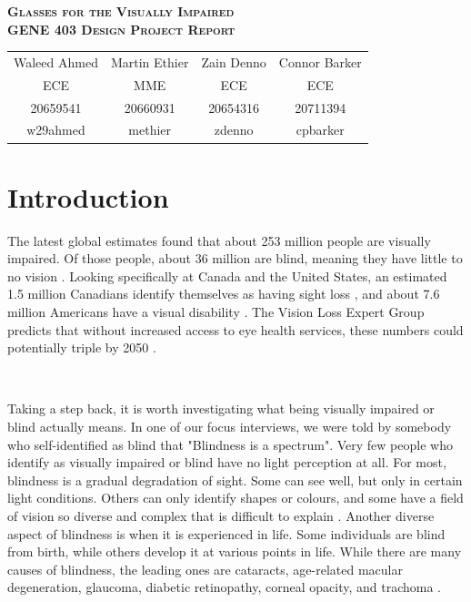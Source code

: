 \documentclass[a4paper,11pt]{article}
\begin{document}
\begin{titlingpage}
    \begin{center}
    
        {\Huge\bfseries\scshape%
            Glasses for the Visually Impaired \\[0.5em]
        }
        {\Large\bfseries\scshape%
            GENE 403 Design Project Report
        }

        \vspace{5em}
        
        \begin{tabular}{cccc}
            Waleed Ahmed & Martin Ethier & Zain Denno & Connor Barker \\
            ECE & MME & ECE & ECE \\
            20659541 & 20660931 & 20654316 & 20711394 \\
            w29ahmed & methier & zdenno & cpbarker
        \end{tabular}
        
        \vspace{5em}
        
        \tableofcontents
    \end{center}
\end{titlingpage}

\newpage

\section{Introduction}
The latest global estimates found that about 253 million people are visually impaired. Of those people, about 36 million are blind, meaning they have little to no vision \cite{orbis-global-blind-data}. Looking specifically at Canada and the United States, an estimated 1.5 million Canadians identify themselves as having sight loss \cite{cnib-blind-data}, and about 7.6 million Americans have a visual disability \cite{nfb-blind-data}. The Vision Loss Expert Group predicts that without increased access to eye health services, these numbers could potentially triple by 2050 \cite{orbis-global-blind-data}.

\

\noindent
Taking a step back, it is worth investigating what being visually impaired or blind actually means. In one of our focus interviews, we were told by somebody who self-identified as blind that "Blindness is a spectrum". Very few people who identify as visually impaired or blind have no light perception at all. For most, blindness is a gradual degradation of sight. Some can see well, but only in certain light conditions. Others can only identify shapes or colours, and some have a field of vision so diverse and complex that is difficult to explain \cite{lighthouse-sf-info-page}. Another diverse aspect of blindness is when it is experienced in life. Some individuals are blind from birth, while others develop it at various points in life. While there are many causes of blindness, the leading ones are cataracts, age-related macular degeneration, glaucoma, diabetic retinopathy, corneal opacity, and trachoma \cite{WHO-blindness}.
\end{document}
